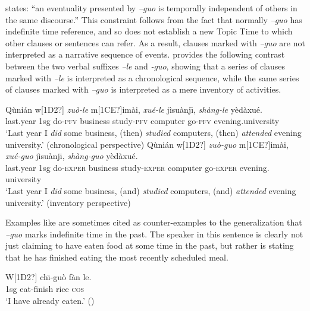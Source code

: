 \citet{Wu2009} states: “an eventuality presented by \textit{–guo} is temporally independent of others in the same discourse.” This constraint follows from the fact that normally \textit{–guo} has indefinite time reference, and so does not establish a new Topic Time to which other clauses or sentences can refer. As a result, clauses marked with \textit{–guo} are not interpreted as a narrative sequence of events. \citet[308]{Iljic1990} provides the following contrast between the two verbal suffixes \textit{–le} and \textit{-guo}, showing that a series of clauses marked with \textit{–le} is interpreted as a chronological sequence, while the same series of clauses marked with \textit{–guo} is interpreted as a mere inventory of activities.


\ea

\ea \gll  Qùnián  w[1D2?]  \textit{zuò-le}  m[1CE?]imài,  \textit{xué-le}  jìsuànj\={\i},  \textit{shàng-le}  yèdàxué.\\
last.year  1sg  do-\textsc{pfv}  business  study-\textsc{pfv}  computer  go-\textsc{pfv}  evening.university\\
\glt ‘Last year I \textit{did} some business, (then) \textit{studied} computers, (then) \textit{attended} evening university.’ (chronological perspective)
\ex \gll  Qùnián  w[1D2?]  \textit{zuò-guo}  m[1CE?]imài,  \textit{xué-guo}  jìsuànj\={\i},  \textit{shàng-guo}  yèdàxué.\\
last.year  1sg  do-\textsc{exper}  business  study-\textsc{exper}  computer  go-\textsc{exper}  evening.          university\\
\glt ‘Last year I \textit{did} some business, (and) \textit{studied} computers, (and) \textit{attended} evening university.’ (inventory perspective)
\z \z


Examples like  are sometimes cited as counter-examples to the generalization that \textit{–guo} marks indefinite time in the past. The speaker in this sentence is clearly not just claiming to have eaten food at some time in the past, but rather is stating that he has finished eating the most recently scheduled meal.


\ea
\gll W[1D2?]  ch\={\i}-guò  fàn  le.\\
1sg  eat-finish  rice  \textsc{cos}\\
\glt ‘I have already eaten.’  (\citealt{Ma1977})
\z


